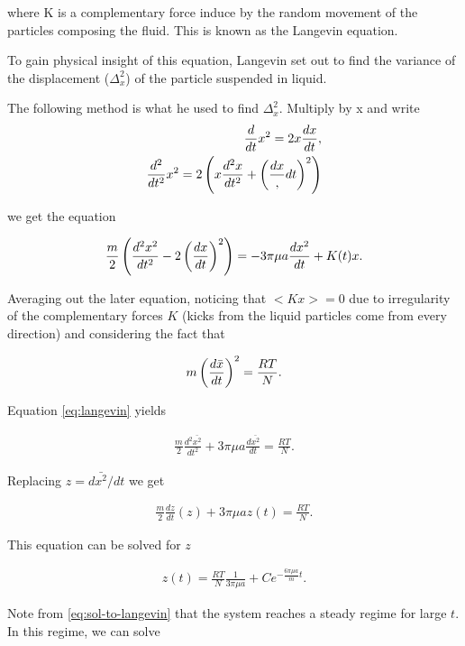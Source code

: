 where K is a complementary force induce by the random movement of the particles composing the fluid. This is known as the Langevin equation. 


To gain physical insight of this equation, Langevin \cite{langevin_original} set out to find the variance of the displacement ($\Delta_x^2$) of the particle suspended in liquid. 

The following method is what he used to find $\Delta_x^2$. Multiply by x and write
\begin{align}
	\frac{d}{dt}x^2 = 2x\frac{dx}{dt},\\	
	\frac{d^2}{dt^2}x^2 = 2\left({x\frac{d^2x}{dt^2}+\left({\frac{dx},{dt}}\right)^2}\right)
\end{align}


we get the equation

\begin{align}
\label{eq:langevin}
	\frac{m}{2}\left({\frac{d^2x^2}{dt^2} - 2\left({\frac{dx}{dt}}\right)^2}\right) = -3\pi\mu a \frac{d x^2}{dt} + K(t)x.
\end{align}

Averaging out the later equation, noticing that $<Kx> = 0$ due to irregularity of the complementary forces $K$ (kicks from the liquid particles come from every direction) and considering the fact that

\begin{align}
	m\left({\frac{d \bar{x}}{dt}}\right)^2 = \frac{RT}{N}.
\end{align}

Equation \ref{eq:langevin} yields

\begin{align}
	\frac{m}{2}\frac{d^2\bar{x^2}}{dt^2} + 3\pi\mu a \frac{d \bar{x^2}}{dt} = \frac{RT}{N}.
\end{align}

Replacing $z = d\bar{x^2}/dt$ we get

\begin{align}
	\frac{m}{2}\frac{dz}{dt}(z) + 3\pi\mu a z(t) = \frac{RT}{N}.
\end{align}

This equation can be solved for $z$

\begin{align}
	\label{eq:sol-to-langevin}
	z(t) = \frac{RT}{N}\frac{1}{3\pi\mu a} + Ce^{-\frac{6\pi\mu a}{m}t}.
\end{align}

Note from \ref{eq:sol-to-langevin} that the system reaches a steady regime for large $t$. In this regime, we can solve

